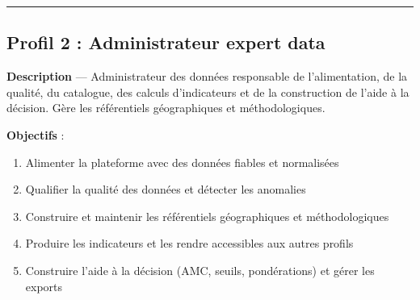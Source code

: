 \documentclass[
  paper=a4,
  oneside  ,captions=tableheading
]{scrartcl}
\providecommand{\tightlist}{%
  \setlength{\itemsep}{0pt}\setlength{\parskip}{0pt}}
\begin{document}
\begin{center}\rule{0.5\linewidth}{0.5pt}\end{center}

\subsection{Profil 2 : Administrateur expert
data}\label{profil-2-administrateur-expert-data}

\textbf{Description} --- Administrateur des données responsable de
l'alimentation, de la qualité, du catalogue, des calculs d'indicateurs
et de la construction de l'aide à la décision. Gère les référentiels
géographiques et méthodologiques.

\textbf{Objectifs} :

\begin{enumerate}
\def\labelenumi{\arabic{enumi}.}
\tightlist
\item
  Alimenter la plateforme avec des données fiables et normalisées
\item
  Qualifier la qualité des données et détecter les anomalies
\item
  Construire et maintenir les référentiels géographiques et
  méthodologiques
\item
  Produire les indicateurs et les rendre accessibles aux autres profils
\item
  Construire l'aide à la décision (AMC, seuils, pondérations) et gérer
  les exports
\end{enumerate}
\end{document}
